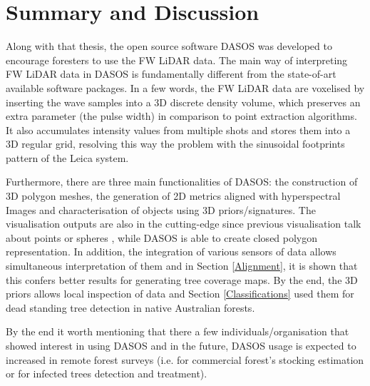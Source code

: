 \documentclass{subfiles}
\begin{document}
	   
	   	
	  \section{Summary and Discussion} \label{DASOS-Vol-Summary}
	  
	   	Along with that thesis, the open source software DASOS was developed to encourage foresters to use the FW LiDAR data. The main way of interpreting FW LiDAR data in DASOS is fundamentally different from the state-of-art available software packages. In a few words, the FW LiDAR data are voxelised by inserting the wave samples into a 3D discrete density volume, which preserves an extra parameter (the pulse width) in comparison to point extraction algorithms. It also accumulates intensity values from multiple shots and stores them into a 3D regular grid, resolving this way the problem with the sinusoidal footprints pattern of the Leica system.
	   	
	   	Furthermore, there are three main functionalities of DASOS: the construction of 3D polygon meshes, the generation of 2D metrics aligned with hyperspectral Images and characterisation of objects using 3D priors/signatures. The visualisation outputs are also in the cutting-edge since previous visualisation talk about points \cite{Bunting2013} or spheres \cite{Chauve2009}, while DASOS is able to create closed polygon representation. In addition, the integration of various sensors of data allows simultaneous interpretation of them and in Section \ref{Alignment}, it is shown that this confers better results for generating tree coverage maps. By the end, the 3D priors allows local inspection of data and Section \ref{Classifications} used them for dead standing tree detection in native Australian forests.
	   		
	   	By the end it worth mentioning that there a few individuals/organisation that showed interest in using DASOS and in the future, DASOS usage is expected to increased in remote forest surveys (i.e. for commercial forest’s stocking estimation or for infected trees detection and treatment).
	   	
	   	
\end{document}
